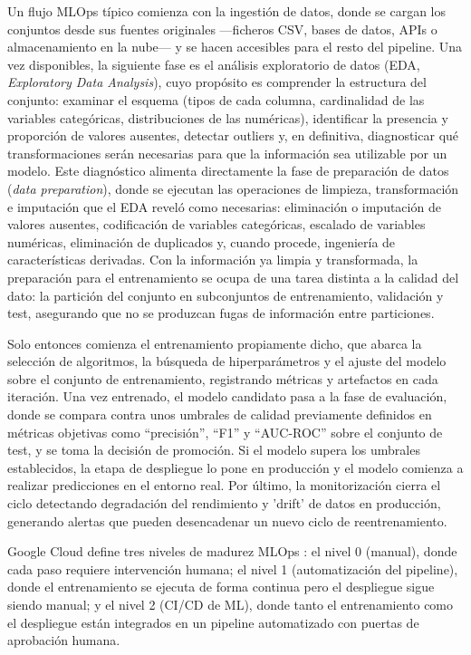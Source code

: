 \documentclass[12pt,a4paper]{article}
\theoremstyle{plain}
\begin{document}
Un flujo MLOps típico comienza con la ingestión de datos, donde se cargan los conjuntos desde sus fuentes originales ---ficheros CSV, bases de datos, APIs o almacenamiento en la nube--- y se hacen accesibles para el resto del pipeline. Una vez disponibles, la siguiente fase es el análisis exploratorio de datos (EDA, \emph{Exploratory Data Analysis}), cuyo propósito es comprender la estructura del conjunto: examinar el esquema (tipos de cada columna, cardinalidad de las variables categóricas, distribuciones de las numéricas), identificar la presencia y proporción de valores ausentes, detectar outliers y, en definitiva, diagnosticar qué transformaciones serán necesarias para que la información sea utilizable por un modelo. Este diagnóstico alimenta directamente la fase de preparación de datos (\emph{data preparation}), donde se ejecutan las operaciones de limpieza, transformación e imputación que el EDA reveló como necesarias: eliminación o imputación de valores ausentes, codificación de variables categóricas, escalado de variables numéricas, eliminación de duplicados y, cuando procede, ingeniería de características derivadas. Con la información ya limpia y transformada, la preparación para el entrenamiento se ocupa de una tarea distinta a la calidad del dato: la partición del conjunto en subconjuntos de entrenamiento, validación y test, asegurando que no se produzcan fugas de información entre particiones.
 
Solo entonces comienza el entrenamiento propiamente dicho, que abarca la selección de algoritmos, la búsqueda de hiperparámetros y el ajuste del modelo sobre el conjunto de entrenamiento, registrando métricas y artefactos en cada iteración. Una vez entrenado, el modelo candidato pasa a la fase de evaluación, donde se compara contra unos umbrales de calidad previamente definidos en métricas objetivas como ``precisión'', ``F1'' y ``AUC-ROC'' sobre el conjunto de test, y se toma la decisión de promoción. Si el modelo supera los umbrales establecidos, la etapa de despliegue lo pone en producción y el modelo comienza a realizar predicciones en el entorno real. Por último, la monitorización cierra el ciclo detectando degradación del rendimiento y 'drift' de datos en producción, generando alertas que pueden desencadenar un nuevo ciclo de reentrenamiento.

Google Cloud define tres niveles de madurez MLOps \cite{google_mlops}: el nivel 0 (manual), donde cada paso requiere intervención humana; el nivel 1 (automatización del pipeline), donde el entrenamiento se ejecuta de forma continua pero el despliegue sigue siendo manual; y el nivel 2 (CI/CD de ML), donde tanto el entrenamiento como el despliegue están integrados en un pipeline automatizado con puertas de aprobación humana.
\end{document}
